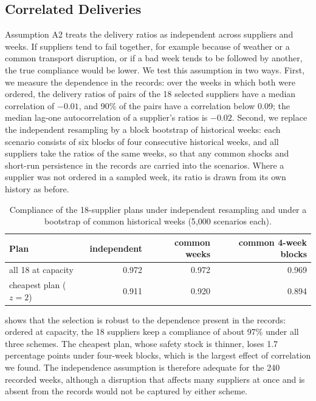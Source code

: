 \documentclass[11pt,a4paper]{article}
\begin{document}
\subsection{Correlated Deliveries}\label{sec:sens-corr}
Assumption A2 treats the delivery ratios as independent across suppliers and weeks.
If suppliers tend to fail together, for example because of weather or a common transport disruption, or if a bad week tends to be followed by another, the true compliance would be lower.
We test this assumption in two ways.
First, we measure the dependence in the records: over the weeks in which both were ordered, the delivery ratios of pairs of the 18 selected suppliers have a median correlation of $-0.01$, and 90\% of the pairs have a correlation below 0.09; the median lag-one autocorrelation of a supplier's ratios is $-0.02$.
Second, we replace the independent resampling by a block bootstrap of historical weeks: each scenario consists of six blocks of four consecutive historical weeks, and all suppliers take the ratios of the same weeks, so that any common shocks and short-run persistence in the records are carried into the scenarios.
Where a supplier was not ordered in a sampled week, its ratio is drawn from its own history as before.

\begin{table}[ht]
\centering
\caption{Compliance of the 18-supplier plans under independent resampling and under a bootstrap of common historical weeks (5{,}000 scenarios each).}\label{tab:stress}
\small
\begin{tabular}{lrrr}
\toprule
Plan & independent & common weeks & common 4-week blocks \\
\midrule
all 18 at capacity & 0.972 & 0.972 & 0.969 \\
cheapest plan ($z=2$) & 0.911 & 0.920 & 0.894 \\
\bottomrule
\end{tabular}
\end{table}

 shows that the selection is robust to the dependence present in the records: ordered at capacity, the 18 suppliers keep a compliance of about 97\% under all three schemes.
The cheapest plan, whose safety stock is thinner, loses 1.7 percentage points under four-week blocks, which is the largest effect of correlation we found.
The independence assumption is therefore adequate for the 240 recorded weeks, although a disruption that affects many suppliers at once and is absent from the records would not be captured by either scheme.
\end{document}
